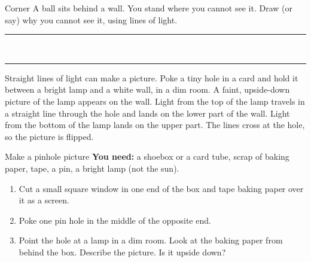 \begin{puzzle}{Corner}
A ball sits behind a wall. You stand where you cannot see it. Draw (or say) why you cannot see it, using lines of light.\\
\rule{\linewidth}{0.5pt}\\[4pt]\rule{\linewidth}{0.5pt}
\end{puzzle}
\clearpage

Straight lines of light can make a picture. Poke a tiny hole in a card and hold it between a bright lamp and a white wall, in a dim room. A faint, upside-down picture of the lamp appears on the wall. Light from the top of the lamp travels in a straight line through the hole and lands on the lower part of the wall. Light from the bottom of the lamp lands on the upper part. The lines cross at the hole, so the picture is flipped.

\begin{center}
\end{center}

\begin{tryit}{Make a pinhole picture}
\textbf{You need:} a shoebox or a card tube, scrap of baking paper, tape, a pin, a bright lamp (not the sun).
\begin{enumerate}[leftmargin=1.6em]
\item Cut a small square window in one end of the box and tape baking paper over it as a screen.
\item Poke one pin hole in the middle of the opposite end.
\item Point the hole at a lamp in a dim room. Look at the baking paper from behind the box. Describe the picture. Is it upside down?
\end{enumerate}
\wline[7cm]
\end{tryit}

